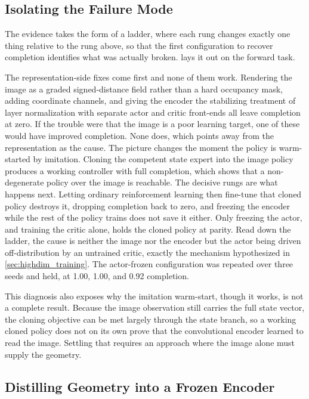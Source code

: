 \subsection{Isolating the Failure Mode}
\label{sec:causal_ladder}

The evidence takes the form of a ladder, where each rung changes exactly one thing relative to the rung above, so that the first configuration to recover completion identifies what was actually broken.  lays it out on the forward task.



The representation-side fixes come first and none of them work. Rendering the image as a graded signed-distance field rather than a hard occupancy mask, adding coordinate channels, and giving the encoder the stabilizing treatment of layer normalization with separate actor and critic front-ends all leave completion at zero. If the trouble were that the image is a poor learning target, one of these would have improved completion. None does, which points away from the representation as the cause. The picture changes the moment the policy is warm-started by imitation. Cloning the competent state expert into the image policy produces a working controller with full completion, which shows that a non-degenerate policy over the image is reachable. The decisive rungs are what happens next. Letting ordinary reinforcement learning then fine-tune that cloned policy destroys it, dropping completion back to zero, and freezing the encoder while the rest of the policy trains does not save it either. Only freezing the actor, and training the critic alone, holds the cloned policy at parity. Read down the ladder, the cause is neither the image nor the encoder but the actor being driven off-distribution by an untrained critic, exactly the mechanism hypothesized in \cref{sec:highdim_training}. The actor-frozen configuration was repeated over three seeds and held, at 1.00, 1.00, and 0.92 completion.

This diagnosis also exposes why the imitation warm-start, though it works, is not a complete result. Because the image observation still carries the full state vector, the cloning objective can be met largely through the state branch, so a working cloned policy does not on its own prove that the convolutional encoder learned to read the image. Settling that requires an approach where the image alone must supply the geometry.

\subsection{Distilling Geometry into a Frozen Encoder}
\label{sec:geometry_encoder}

